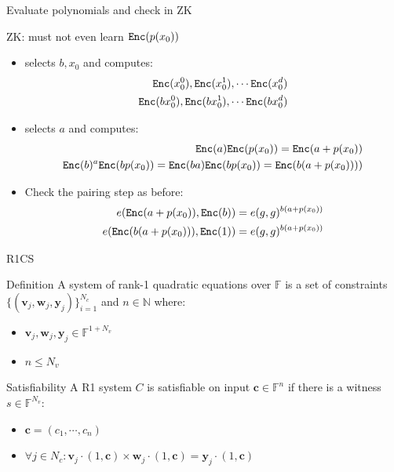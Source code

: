 \documentclass[handouts]{beamer}
\begin{document}
\begin{frame}{Evaluate polynomials and check in ZK}
\begin{small}
ZK: \ver must not even learn $\mathtt{Enc}(p(x_0))$  \pause
\begin{itemize}
    \item \ver selects $b,x_0$ and computes:   \begin{align*}
        \mathtt{Enc}(x_0^0),\mathtt{Enc}(x_0^1),\cdots \mathtt{Enc}(x_0^d)    \\
         \mathtt{Enc}(bx_0^0),\mathtt{Enc}(bx_0^1),\cdots \mathtt{Enc}(bx_0^d) \end{align*} \pause
    \item \prv selects $a$ and computes:  \pause
        \begin{align*}
        \mathtt{Enc}(a)\mathtt{Enc}(p(x_0)) = \mathtt{Enc}(a+p(x_0)) \\
        \mathtt{Enc}(b)^a \mathtt{Enc}(bp(x_0)) = \mathtt{Enc}(ba)\mathtt{Enc}(bp(x_0)) = \mathtt{Enc}(b(a+p(x_0))))
        \end{align*} \pause
    \item Check the pairing step as before:
        \begin{align*}
        e(\mathtt{Enc}(a+p(x_0)),\mathtt{Enc}(b))=e(g,g)^{b(a+p(x_0))} \\
        e(\mathtt{Enc}(b(a+p(x_0))),\mathtt{Enc}(1))=e(g,g)^{b(a+p(x_0))} 
        \end{align*}
\end{itemize}
\end{small}
\end{frame}

\begin{frame}{R1CS}

\begin{block}{Definition}
A system of rank-1 quadratic equations over $\mathbb{F}$ is a set of constraints $\{ (\bm{v}_j, \bm{w}_j, \bm{y}_j) \}_{i=1}^{N_c} $ and $n \in \mathbb{N}$ where:
\begin{itemize}
    \item $\bm{v}_j,\bm{w}_j,\bm{y}_j \in \mathbb{F}^{1+N_v}$
    \item $n \leq N_v$
\end{itemize}
\end{block}
\pause
\begin{block}{Satisfiability}
A R1 system $C$ is satisfiable on input $\bm{c} \in \mathbb{F}^n$ if there is a witness $s \in \mathbb{F}^{N_v}:$
\begin{itemize}
    \item $\bm{c} = (c_1, \cdots, c_n)$
    \item $\forall j \in N_c:  \bm{v}_j \cdotp (1,\bm{c})  \times  \bm{w}_j \cdotp (1,\bm{c})  =  \bm{y}_j \cdotp (1,\bm{c})$
\end{itemize}
\end{block}  
\end{frame}
\end{document}
